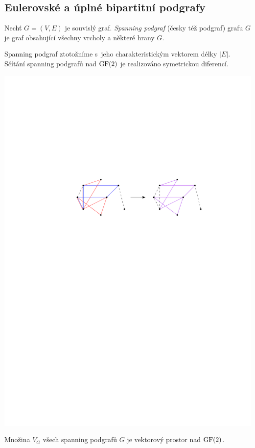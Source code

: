 \subsection{Eulerovské a úplné bipartitní podgrafy}


\df Nechť $G = (V,E)$ je souvislý graf. {\it Spanning podgraf} (česky též  podgraf) grafu $G$ je graf obsahující všechny vrcholy a některé hrany $G$.

\medskip
Spanning podgraf ztotožníme s~jeho charakteristickým vektorem délky $|E|$. Sčítání spanning podgrafů nad $\mathrm{GF}(2)$ je realizováno symetrickou diferencí.

\begin{center}
	\includegraphics{symetricka_diference.pdf}
\end{center}

\tv Množina $V_G$ všech spanning podgrafů $G$ je vektorový prostor nad $\mathrm{GF}(2)$.

